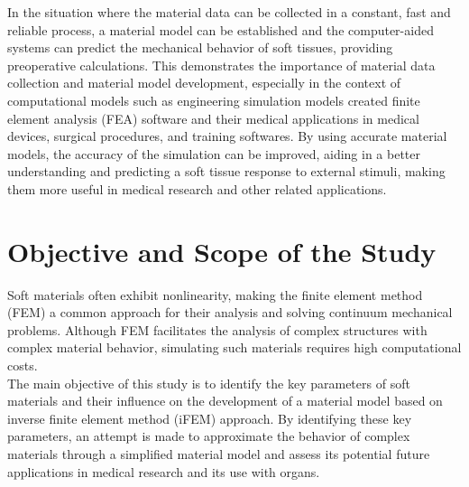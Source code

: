 
In the situation where the material data can be collected in a constant, fast and reliable
process, a material model can be established and the computer-aided systems can predict 
the mechanical behavior of soft tissues, providing preoperative calculations. 
This demonstrates the importance of material data collection and material model development, 
especially in the context of computational models such as engineering simulation models created finite 
element analysis (FEA) software and their medical applications in medical devices, surgical 
procedures, and training softwares. By using accurate material models, the accuracy of the simulation 
can be improved, aiding in a better understanding and predicting a soft tissue response 
to external stimuli, making them more useful in medical research and other related applications.\\

\section{Objective and Scope of the Study} 

Soft materials often exhibit nonlinearity, making the finite element method (FEM) a common approach 
for their analysis and solving continuum mechanical problems. 
Although FEM facilitates the analysis of complex structures with complex material 
behavior, simulating such materials requires high computational costs.\\

The main objective of this study is to identify the key parameters of soft materials and their 
influence on the development of a material model based on inverse finite element method (iFEM) approach. 
By identifying these key parameters, an attempt is made to approximate the behavior of 
complex materials through a simplified material model and
assess its potential future applications in medical research and its use with organs.\\


